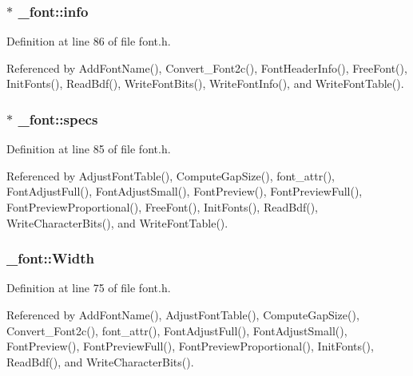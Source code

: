 \hypertarget{struct__font_abf134e8a44e707d3b4e83ab76c952ed9}{
\subsubsection[{info}]{ $\ast$ \-\_\-font\-::info}}\label{struct__font_abf134e8a44e707d3b4e83ab76c952ed9}


Definition at line 86 of file font.\-h.



Referenced by Add\-Font\-Name(), Convert\-\_\-\-Font2c(), Font\-Header\-Info(), Free\-Font(), Init\-Fonts(), Read\-Bdf(), Write\-Font\-Bits(), Write\-Font\-Info(), and Write\-Font\-Table().

\hypertarget{struct__font_a76b5b07cf75a869627eca27d7a32836a}{
\subsubsection[{specs}]{ $\ast$ \-\_\-font\-::specs}}\label{struct__font_a76b5b07cf75a869627eca27d7a32836a}


Definition at line 85 of file font.\-h.



Referenced by Adjust\-Font\-Table(), Compute\-Gap\-Size(), font\-\_\-attr(), Font\-Adjust\-Full(), Font\-Adjust\-Small(), Font\-Preview(), Font\-Preview\-Full(), Font\-Preview\-Proportional(), Free\-Font(), Init\-Fonts(), Read\-Bdf(), Write\-Character\-Bits(), and Write\-Font\-Table().

\hypertarget{struct__font_ae3d3b48670f1bf4bf6dbf42794f81b31}{
\subsubsection[{Width}]{ \-\_\-font\-::\-Width}}\label{struct__font_ae3d3b48670f1bf4bf6dbf42794f81b31}


Definition at line 75 of file font.\-h.



Referenced by Add\-Font\-Name(), Adjust\-Font\-Table(), Compute\-Gap\-Size(), Convert\-\_\-\-Font2c(), font\-\_\-attr(), Font\-Adjust\-Full(), Font\-Adjust\-Small(), Font\-Preview(), Font\-Preview\-Full(), Font\-Preview\-Proportional(), Init\-Fonts(), Read\-Bdf(), and Write\-Character\-Bits().

